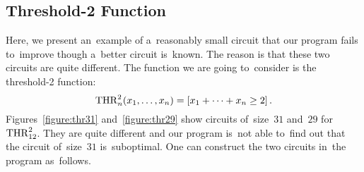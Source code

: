 \subsection{Threshold-2 Function}
Here, we present an~example of a~reasonably small circuit
that our program fails to~improve though a~better circuit
is~known. The reason is that these two circuits are quite
different. The function we are going to~consider is the threshold-2 function:
\[\operatorname{THR}_n^2(x_1, \dotsc, x_n)=[x_1+\dotsb+x_n \ge 2] \, .\]
Figures~\ref{figure:thr31} and~\ref{figure:thr29} show circuits of~size~$31$ and~$29$ for $\operatorname{THR}_{12}^2$.
They are 
quite different and our program is~not able to~find out 
that the circuit 
of~size~$31$ is~suboptimal.
One can construct the two circuits in~the program as~follows.

\inputminted[firstline=90,lastline=96]{python}{../tutorial.py}

